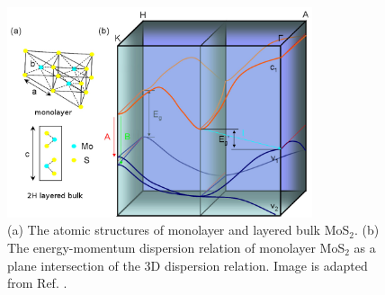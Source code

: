 \begin{figure}[htbp!] 
\centering  
\includegraphics[width=0.8\textwidth]{mos2_band.png}
\caption{(a) The atomic structures of monolayer and layered bulk MoS$_2$. (b) The energy-momentum dispersion relation of monolayer MoS$_2$ as a plane intersection of the 3D dispersion relation. Image is adapted from Ref. \cite{Mak2010}. }  
\label{fig:mos2_band}
\end{figure} 

